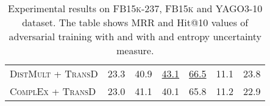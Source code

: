 \begin{table}[H]
\begin{tabular}{lllllll}
          \textsc{DistMult} + \textsc{TransD}
          & 23.3 
          & 40.9  
           & \underline{43.1} 
           & \underline{66.5}
           & 11.1
           & 23.8\\
        
         \textsc{ComplEx} + \textsc{TransD}
          & 23.0  
          & 41.1  
          & 40.1 
          & 65.8
          & 11.2
          & 22.9\\
          
        \bottomrule
    \end{tabular}
    \caption{Experimental results on \textsc{FB15k-237}, \textsc{FB15k} and \textsc{YAGO3-10} dataset.
    The table shows MRR and Hit@10 values of adversarial training with \kbgan and  \usgan with \ussoftmax and entropy uncertainty measure.}
\label{tab:result_table3}
\end{table}